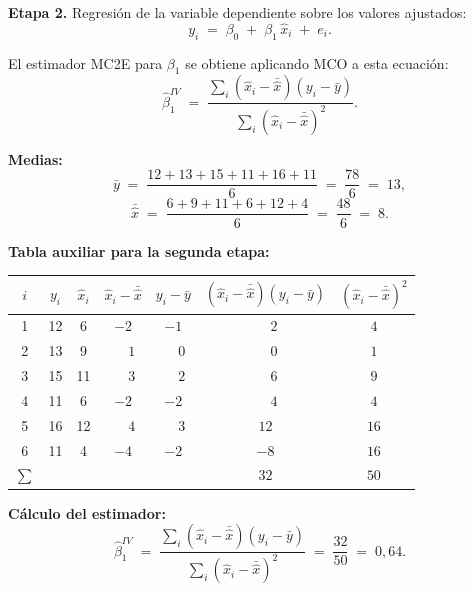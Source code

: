 \documentclass[10pt,a4paper]{article}
\begin{document}
\begin{enumerate}
\vspace{0.3cm}
 
\noindent\textbf{Etapa 2.} Regresión de la variable dependiente sobre los valores ajustados:
\[
y_i \;=\; \beta_0 \;+\; \beta_1\,\hat{x}_i \;+\; e_i.
\]
 
\noindent El estimador MC2E para $\beta_1$ se obtiene aplicando MCO a esta ecuación:
\[
\hat\beta_1^{IV} \;=\; \frac{\sum_i (\hat{x}_i - \bar{\hat{x}})(y_i - \bar y)}{\sum_i (\hat{x}_i - \bar{\hat{x}})^{2}}.
\]
 
\vspace{0.3cm}
 
\noindent\textbf{Medias:}
\[
\bar y \;=\; \frac{12 + 13 + 15 + 11 + 16 + 11}{6} \;=\; \frac{78}{6} \;=\; 13,
\]
\[
\bar{\hat{x}} \;=\; \frac{6 + 9 + 11 + 6 + 12 + 4}{6} \;=\; \frac{48}{6} \;=\; 8.
\]
 
\vspace{0.3cm}
 
\noindent\textbf{Tabla auxiliar para la segunda etapa:}
 

\begin{center}
\begin{tabular}{|c|c|c|c|c|c|c|}
\toprule
\hline
$i$ & $y_i$ & $\hat{x}_i$ & $\hat{x}_i - \bar{\hat{x}}$ & $y_i - \bar y$ & $(\hat{x}_i - \bar{\hat{x}})(y_i - \bar y)$  &  $(\hat{x}_i - \bar{\hat{x}})^{2}$ \\
\midrule
\hline
1 & 12 & 6  & $-2$ & $-1$ & $\phantom{-}2 $  &  $4$  \\
2 & 13 & 9  & $\phantom{-}1$  & $\phantom{-}0$  & $\phantom{-}0$  &  $1$  \\
3 & 15 & 11 & $\phantom{-}3$  & $\phantom{-}2$  & $\phantom{-}6$  &  $9$  \\
4 & 11 & 6  & $-2$ & $-2$ & $\phantom{-}4$  &  $4$  \\
5 & 16 & 12 & $\phantom{-}4$  & $\phantom{-}3$  & $12$  &  $16$ \\
6 & 11 & 4  & $-4$ & $-2$ & $ {-}8$  &  $16$ \\
\midrule
\hline
$\sum$ & & & & & $32$  &  $50$ \\
\bottomrule
\hline
\end{tabular}
\end{center}
 
\vspace{0.3cm}
 
\noindent\textbf{Cálculo del estimador:}
\[
\hat\beta_1^{IV} \;=\; \frac{\sum_i (\hat{x}_i - \bar{\hat{x}})(y_i - \bar y)}{\sum_i (\hat{x}_i - \bar{\hat{x}})^{2}} \;=\; \frac{32}{50} \;=\; 0{,}64.
\]
 

\end{enumerate}
\end{document}
